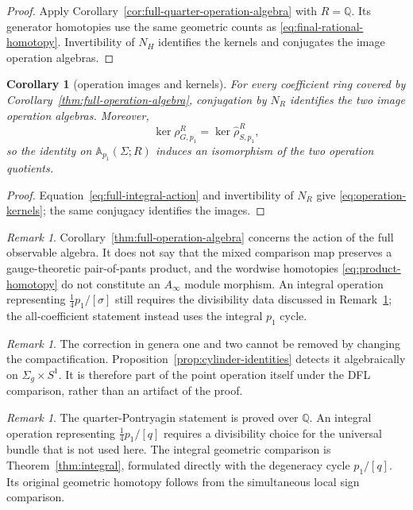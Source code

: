 \documentclass[11pt]{amsart}
\newtheorem{corollary}[theorem]{Corollary}
\theoremstyle{definition}
\theoremstyle{remark}
\newtheorem{remark}[theorem]{Remark}
\theoremstyle{plain}
\newcommand{\QQ}{\mathbb{Q}}
\begin{document}
\begin{proof}
Apply Corollary~\ref{cor:full-quarter-operation-algebra}
with $R=\QQ$. Its generator homotopies use the
same geometric counts as \eqref{eq:final-rational-homotopy}.
Invertibility of $N_H$ identifies the kernels
and conjugates the image operation algebras.
\end{proof}

\begin{corollary}[operation images and kernels]
\label{cor:operation-images-kernels}
For every coefficient ring covered by
Corollary~\ref{thm:full-operation-algebra}, conjugation by $N_R$ identifies the
two image operation algebras.  Moreover,
\begin{equation}\label{eq:operation-kernels}
 \ker\rho_{G,p_1}^R=\ker\widehat\rho_{S,p_1}^R,
\end{equation}
so the identity on $\mathbb A_{p_1}(\Sigma;R)$ induces an isomorphism of the
two operation quotients.
\end{corollary}

\begin{proof}
Equation~\eqref{eq:full-integral-action} and invertibility of $N_R$ give
\eqref{eq:operation-kernels}; the same conjugacy identifies the images.
\end{proof}

\begin{remark}\label{rem:operation-algebra-boundary}
Corollary~\ref{thm:full-operation-algebra} concerns the action of the full
observable algebra.  It does not say that the mixed comparison map preserves
a gauge-theoretic pair-of-pants product, and the wordwise homotopies
\eqref{eq:product-homotopy} do not constitute an $A_\infty$ module morphism.
An integral operation representing $\frac14p_1/[\sigma]$ still requires the
divisibility data discussed in Remark~\ref{rem:coefficients}; the
all-coefficient statement instead uses the integral $p_1$ cycle.
\end{remark}

\begin{remark}\label{rem:uncorrected-false}
The correction in genera one and two cannot be removed by changing the
compactification.  Proposition~\ref{prop:cylinder-identities} detects it
algebraically on $\Sigma_g\times S^1$.  It is therefore part of the point
operation itself under the DFL comparison, rather than an artifact of the
proof.
\end{remark}

\begin{remark}\label{rem:coefficients}
The quarter-Pontryagin statement is proved over $\QQ$. An integral
operation representing $\frac14p_1/[q]$ requires a divisibility choice for
the universal bundle that is not used here. The
integral geometric comparison is Theorem~\ref{thm:integral},
formulated directly with the degeneracy cycle $p_1/[q]$.
Its original geometric homotopy follows from the
simultaneous local sign comparison.
\end{remark}
\end{document}
